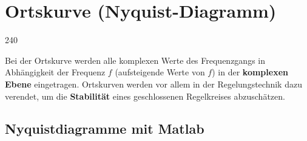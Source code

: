 \section{Ortskurve (Nyquist-Diagramm)}{240}

Bei der Ortskurve werden alle komplexen Werte des Frequenzgangs in Abhängigkeit der Frequenz $f$ (aufsteigende Werte von $f$) 
in der \textbf{komplexen Ebene} eingetragen. Ortskurven werden vor allem in der Regelungstechnik dazu verendet, um die 
\textbf{Stabilität} eines geschlossenen Regelkreises abzuschätzen.


\subsection{Nyquistdiagramme mit Matlab}




